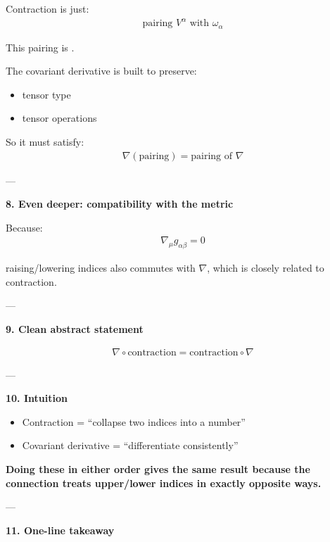 \documentclass[12pt,a4paper]{report}
\begin{document}
\begin{description}
\begin{description}
Contraction is just:
\begin{align*}
\text{pairing } V^\alpha \text{ with } \omega_\alpha
\end{align*}

This pairing is .

The covariant derivative is built to preserve:

\begin{itemize}
\item tensor type
\item tensor operations
\end{itemize}

So it must satisfy:
\begin{align*}
\nabla(\text{pairing}) = \text{pairing of } \nabla
\end{align*}

---

\item \textbf{8. Even deeper: compatibility with the metric}

Because:
\begin{align*}
\nabla_\mu g_{\alpha\beta} = 0
\end{align*}

raising/lowering indices also commutes with $\nabla$, which is closely related to contraction.

---

\item \textbf{9. Clean abstract statement}

\begin{align*}
\boxed{
\nabla \circ \text{contraction} = \text{contraction} \circ \nabla }
\end{align*}

---

\item \textbf{10. Intuition}

\begin{itemize}
\item Contraction = “collapse two indices into a number”
\item Covariant derivative = “differentiate consistently”
\end{itemize}

\textbf{ Doing these in either order gives the same result because the connection treats upper/lower indices in exactly opposite ways.}

---

\item \textbf{11. One-line takeaway}


\end{description}
\end{description}
\end{document}
